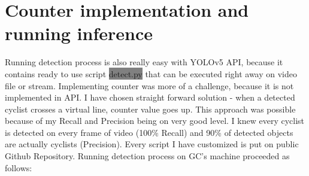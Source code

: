 \section{Counter implementation and running inference}
\label{sec:inference}
Running detection process is also really easy with YOLOv5 API, because it contains ready to use script \colorbox{Gray}{detect.py} that can be executed right away on video file or stream. Implementing counter was more of a challenge, because it is not implemented in API. I have chosen straight forward solution - when a detected cyclist crosses a virtual line, counter value goes up. This approach was possible because of my Recall and Precision being on very good level. I knew every cyclist is detected on every frame of video (100\% Recall) and 90\% of detected objects are actually cyclists (Precision). Every script I have customized is put on public Github Repository\cite{repo}. Running detection process on GC's machine proceeded as follows:

